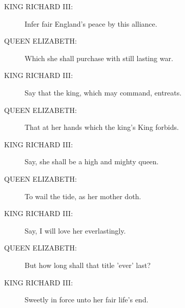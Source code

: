 \documentclass{article}
\begin{document}
\begin{description}
\item[KING RICHARD III:] 
\hspace{1pt}Infer fair England's peace by this alliance.\\
\end{description}
\begin{description}
\item[QUEEN ELIZABETH:] 
\hspace{1pt}Which she shall purchase with still lasting war.\\
\end{description}
\begin{description}
\item[KING RICHARD III:] 
\hspace{1pt}Say that the king, which may command, entreats.\\
\end{description}
\begin{description}
\item[QUEEN ELIZABETH:] 
\hspace{1pt}That at her hands which the king's King forbids.\\
\end{description}
\begin{description}
\item[KING RICHARD III:] 
\hspace{1pt}Say, she shall be a high and mighty queen.\\
\end{description}
\begin{description}
\item[QUEEN ELIZABETH:] 
\hspace{1pt}To wail the tide, as her mother doth.\\
\end{description}
\begin{description}
\item[KING RICHARD III:] 
\hspace{1pt}Say, I will love her everlastingly.\\
\end{description}
\begin{description}
\item[QUEEN ELIZABETH:] 
\hspace{1pt}But how long shall that title 'ever' last?\\
\end{description}
\begin{description}
\item[KING RICHARD III:] 
\hspace{1pt}Sweetly in force unto her fair life's end.\\
\end{description}
\end{document}
